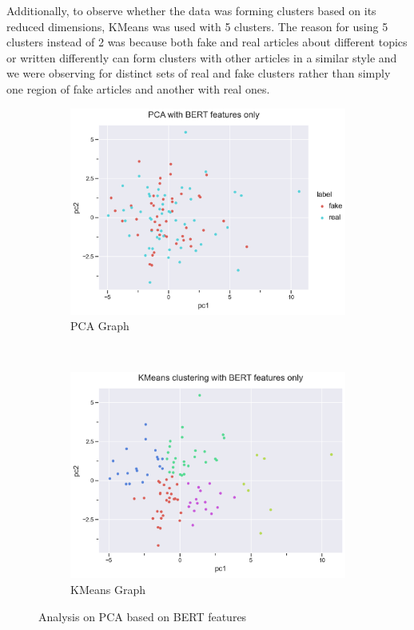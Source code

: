 \documentclass{article}
\begin{document}
Additionally, to observe whether the data was forming clusters based on its reduced dimensions, KMeans was used with 5 clusters. The reason for using 5 clusters instead of 2 was because both fake and real articles about different topics or written differently can form clusters with other articles in a similar style and we were observing for distinct sets of real and fake clusters rather than simply one region of fake articles and another with real ones.

\begin{figure}[t!]
  \centering
  \begin{subfigure}[t]{0.5\textwidth}
    \centering
    \includegraphics[scale=0.5]{img/pca_1.png}
    \caption{PCA Graph}
    \label{pca_1}
  \end{subfigure}%
  ~
  \begin{subfigure}[t]{0.5\textwidth}
    \centering
    \includegraphics[scale=0.5]{img/kmeans_1.png}
    \caption{KMeans Graph}
    \label{kmeans_1}
  \end{subfigure}
  \caption{Analysis on PCA based on BERT features}
  \label{pca_kmeans_1}
\end{figure}
\end{document}
